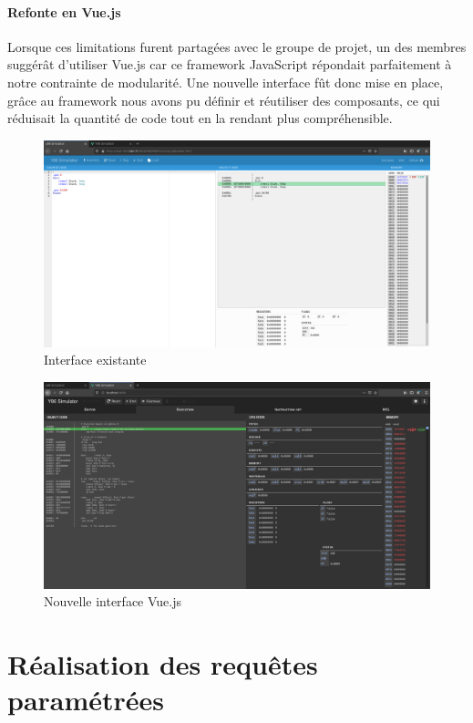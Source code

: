 \documentclass[french]{article}
\begin{document}
\paragraph{Refonte en Vue.js}

Lorsque ces limitations furent partagées avec le groupe de projet, un des membres suggérât d'utiliser Vue.js car ce framework JavaScript répondait parfaitement à notre contrainte de modularité. Une nouvelle interface fût donc mise en place, grâce au framework nous avons pu définir et réutiliser des composants, ce qui réduisait la quantité de code tout en la rendant plus compréhensible.

\begin{figure}[H]
    \centering
    \includegraphics[width=12cm]{img/old_ui.png}
    \caption{Interface existante}
    \label{fig:old_ui}
\end{figure}

\begin{figure}[H]
    \centering
    \includegraphics[width=12cm]{img/new_ui.png}
    \caption{Nouvelle interface Vue.js}
    \label{fig:new_ui}
\end{figure}

\section{Réalisation des requêtes paramétrées}
\end{document}

